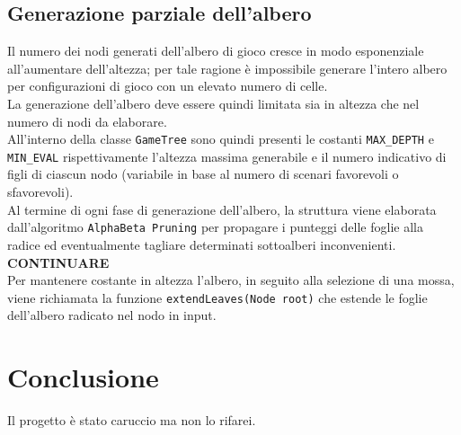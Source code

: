 \documentclass[11pt]{article}
\begin{document}
\subsection*{Generazione parziale dell'albero}
Il numero dei nodi generati dell'albero di gioco cresce in modo esponenziale all'aumentare dell'altezza;
per tale ragione è impossibile generare l'intero albero per configurazioni di gioco con un elevato numero di celle.\\
La generazione dell'albero deve essere quindi limitata sia in altezza che nel numero di nodi da elaborare.\\
All'interno della classe \texttt{GameTree} sono quindi presenti le costanti \texttt{MAX\_DEPTH} e \texttt{MIN\_EVAL} rispettivamente l'altezza massima generabile e il numero indicativo di figli di ciascun nodo (variabile in base al numero di scenari favorevoli o sfavorevoli).\\
Al termine di ogni fase di generazione dell'albero, la struttura viene elaborata dall'algoritmo \texttt{AlphaBeta Pruning} per propagare i punteggi delle foglie alla radice ed eventualmente tagliare determinati sottoalberi inconvenienti.\\
\textbf{CONTINUARE}\\
Per mantenere costante in altezza l'albero, in seguito alla selezione di una mossa, viene richiamata la funzione \texttt{extendLeaves(Node root)} che estende le foglie dell'albero radicato nel nodo in input.

\section*{Conclusione}
Il progetto è stato caruccio ma non lo rifarei.
\end{document}
